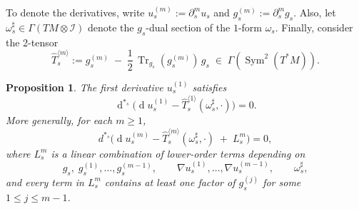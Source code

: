 \documentclass[11pt]{amsart}
\newcommand{\Tr}{\operatorname{Tr}}
\renewcommand{\d}{\operatorname{d}}
\newtheorem{proposition}[theorem]{Proposition}
\begin{document}
To denote the derivatives, write $u_s^{(m)}:=\partial_s^m u_s$ and $g_s^{(m)}:=\partial_s^m g_s$.
Also, let $\omega_s^\sharp\in \Gamma(TM\otimes \mathcal{I})$ denote the $g_s$-dual section of the $1$-form $\omega_s$.
Finally, consider the 2-tensor
\begin{equation}\label{eq:Tms}
	\widehat T^{\langle m\rangle}_s
	:= g_s^{(m)} \;-\; \frac12\,\Tr_{g_s}(g_s^{(m)})\, g_s \;\in\; \Gamma(\operatorname{Sym}^2(T^*M)).
\end{equation}
\begin{proposition}\label{prop:linearized-equation}
	The first derivative $u_s^{(1)}$ satisfies
	\begin{equation}\label{eq_firstequation}
		\d^{*_s}\!\big(\!\d u_s^{(1)} - \widehat T^{\langle 1\rangle}_s(\omega_s^\sharp,\cdot)\big) = 0.
	\end{equation}
	More generally, for each $m\ge 1$,
	\begin{equation}
		\label{eq_higherorderequation}
		d^{*_s}\big(\!\d u_s^{(m)} - \widehat T^{\langle m\rangle}_s(\omega_s^\sharp,\cdot) \;+\;L^m_s\big) = 0, 
	\end{equation}
	where $L^m_s$ is a linear combination of lower-order terms depending on
	\[
	g_s,\; g_s^{(1)},\ldots,g_s^{(m-1)},\qquad
	\nabla u_s^{(1)},\ldots,\nabla u_s^{(m-1)},\qquad
	\omega_s^\sharp,
	\]
	and every term in $L^m_s$ contains at least one factor of $g_s^{(j)}$ for some $1\le j\le m-1$.
\end{proposition}
\end{document}
